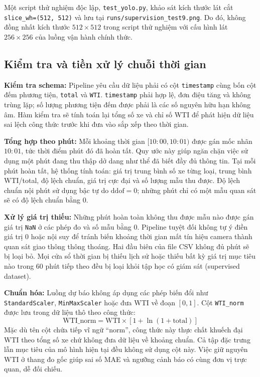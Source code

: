     Một script thử nghiệm độc lập, \texttt{test\_yolo.py}, khảo sát kích thước lát cắt \texttt{slice\_wh=(512, 512)} và lưu tại \texttt{runs/supervision\_test9.png}. Do đó, không đồng nhất kích thước $512 \times 512$ trong script thử nghiệm với cấu hình lát $256 \times 256$ của luồng vận hành chính thức.

    \subsection{Kiểm tra và tiền xử lý chuỗi thời gian}
    \textbf{Kiểm tra schema:} Pipeline yêu cầu dữ liệu phải có cột \texttt{timestamp} cùng bốn cột đếm phương tiện, \texttt{total} và \texttt{WTI}. \texttt{timestamp} phải hợp lệ, đơn điệu tăng và không trùng lặp; số lượng phương tiện đếm được phải là các số nguyên hữu hạn không âm. Hàm kiểm tra sẽ tính toán lại tổng số xe và chỉ số WTI để phát hiện dữ liệu sai lệch công thức trước khi đưa vào sắp xếp theo thời gian.

    \textbf{Tổng hợp theo phút:} Mỗi khoảng thời gian $[10:00, 10:01)$ được gán mốc nhãn $10:01$, tức thời điểm phút đó đã hoàn tất. Quy ước này giúp ngăn chặn việc sử dụng một phút đang thu thập dở dang như thể đã biết đầy đủ thông tin. Tại mỗi phút hoàn tất, hệ thống tính toán: giá trị trung bình số xe từng loại, trung bình WTI/total, độ lệch chuẩn, giá trị cực đại và số lượng mẫu thu được. Độ lệch chuẩn nội phút sử dụng bậc tự do $\text{ddof} = 0$; những phút chỉ có một mẫu quan sát sẽ có độ lệch chuẩn bằng 0.

    \textbf{Xử lý giá trị thiếu:} Những phút hoàn toàn không thu được mẫu nào được gán giá trị \texttt{NaN} ở các phép đo và số mẫu bằng 0. Pipeline tuyệt đối không tự ý điền giá trị 0 hoặc nội suy để tránh biến khoảng thời gian mất tín hiệu camera thành quan sát giao thông thông thoáng. Hai đầu biên của file CSV không đủ phút sẽ bị loại bỏ. Mọi cửa sổ thời gian bị thiếu lịch sử hoặc thiếu bất kỳ giá trị mục tiêu nào trong 60 phút tiếp theo đều bị loại khỏi tập học có giám sát (supervised dataset).

    \textbf{Chuẩn hóa:} Luồng dự báo không áp dụng các phép biến đổi như \texttt{StandardScaler}, \texttt{MinMaxScaler} hoặc đưa WTI về đoạn $[0, 1]$. Cột \texttt{WTI\_norm} được lưu trong dữ liệu thô theo công thức:
    \[
    \text{WTI\_norm} = \text{WTI} \times [1 + \ln(1 + \text{total})]
    \]
    Mặc dù tên cột chứa tiếp vĩ ngữ ``norm'', công thức này thực chất khuếch đại WTI theo tổng số xe chứ không đưa dữ liệu về khoảng chuẩn. Cả tập đặc trưng lẫn mục tiêu của mô hình hiện tại đều không sử dụng cột này. Việc giữ nguyên WTI ở thang đo gốc giúp sai số MAE và ngưỡng cảnh báo có cùng đơn vị trực quan, dễ đối chiếu.

